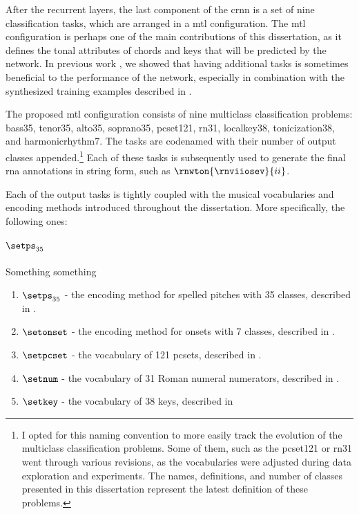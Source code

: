 
After the recurrent layers, the last component of the
\gls{crnn} is a set of nine classification tasks, which are
arranged in a \gls{mtl} configuration. The \gls{mtl}
configuration is perhaps one of the main contributions of
this dissertation, as it defines the tonal attributes of
chords and keys that will be predicted by the network. In
previous work \parencite{napoleslopez2021augmentednet}, we
showed that having additional tasks is sometimes beneficial
to the performance of the network, especially in combination
with the synthesized training examples described in
.

The proposed \gls{mtl} configuration consists of nine
multiclass classification problems: \gls{bass35},
\gls{tenor35}, \gls{alto35}, \gls{soprano35},
\gls{pcset121}, \gls{rn31}, \gls{localkey38},
\gls{tonicization38}, and \gls{harmonicrhythm7}. The tasks
are codenamed with their number of output classes
appended.\footnote{I opted for this naming convention to
more easily track the evolution of the multiclass
classification problems. Some of them, such as the
\gls{pcset121} or \gls{rn31} went through various revisions,
as the vocabularies were adjusted during data exploration
and experiments. The names, definitions, and number of
classes presented in this dissertation represent the latest
definition of these problems.} Each of these tasks is
subsequently used to generate the final \gls{rna}
annotations in string form, such as
$\rnwton{\rnviiosev}{ii}$.

Each of the output tasks is tightly coupled with the musical
vocabularies and encoding methods introduced throughout the
dissertation. More specifically, the following ones:

\paragraph{$\setps_{35}$}

Something something


\begin{enumerate}
    \item[] $\setps_{35}$ - the encoding method for spelled
    pitches with 35 classes, described in
    .
    \item[] $\setonset$ - the encoding method for onsets with 7
    classes, described in
    .
    \item[] $\setpcset$ - the vocabulary of 121 \gls{pcset}s,
    described in .
    \item[] $\setnum$ - the vocabulary of 31 Roman numeral
    numerators, described in
    .
    \item[] $\setkey$ - the vocabulary of 38 keys, described in
\end{enumerate}

